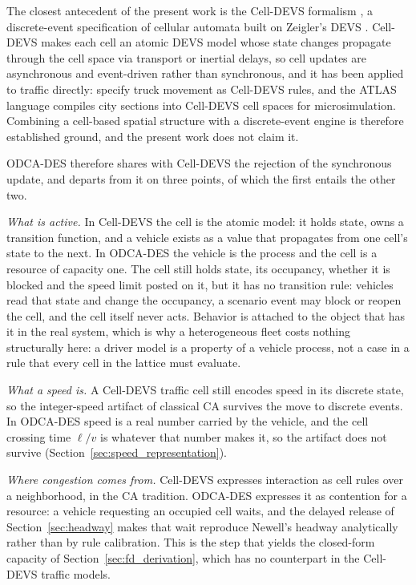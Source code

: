 \documentclass[review,number]{elsarticle}
\begin{document}
The closest antecedent of the present work is the Cell-DEVS formalism \citep{wainer2001timed,wainer2014cellular}, a discrete-event specification of cellular automata built on Zeigler's DEVS \citep{zeigler2000theory}. Cell-DEVS makes each cell an atomic DEVS model whose state changes propagate through the cell space via transport or inertial delays, so cell updates are asynchronous and event-driven rather than synchronous, and it has been applied to traffic directly: \citet{davidson2000specifying} specify truck movement as Cell-DEVS rules, and the ATLAS language \citep{wainer2006atlas} compiles city sections into Cell-DEVS cell spaces for microsimulation. Combining a cell-based spatial structure with a discrete-event engine is therefore established ground, and the present work does not claim it.

ODCA-DES therefore shares with Cell-DEVS the rejection of the synchronous update, and departs from it on three points, of which the first entails the other two.

\emph{What is active.} In Cell-DEVS the cell is the atomic model: it holds state, owns a transition function, and a vehicle exists as a value that propagates from one cell's state to the next. In ODCA-DES the vehicle is the process and the cell is a resource of capacity one. The cell still holds state, its occupancy, whether it is blocked and the speed limit posted on it, but it has no transition rule: vehicles read that state and change the occupancy, a scenario event may block or reopen the cell, and the cell itself never acts. Behavior is attached to the object that has it in the real system, which is why a heterogeneous fleet costs nothing structurally here: a driver model is a property of a vehicle process, not a case in a rule that every cell in the lattice must evaluate.

\emph{What a speed is.} A Cell-DEVS traffic cell still encodes speed in its discrete state, so the integer-speed artifact of classical CA survives the move to discrete events. In ODCA-DES speed is a real number carried by the vehicle, and the cell crossing time $\ell/v$ is whatever that number makes it, so the artifact does not survive (Section~\ref{sec:speed_representation}).

\emph{Where congestion comes from.} Cell-DEVS expresses interaction as cell rules over a neighborhood, in the CA tradition. ODCA-DES expresses it as contention for a resource: a vehicle requesting an occupied cell waits, and the delayed release of Section~\ref{sec:headway} makes that wait reproduce Newell's headway analytically rather than by rule calibration. This is the step that yields the closed-form capacity of Section~\ref{sec:fd_derivation}, which has no counterpart in the Cell-DEVS traffic models.
\end{document}
